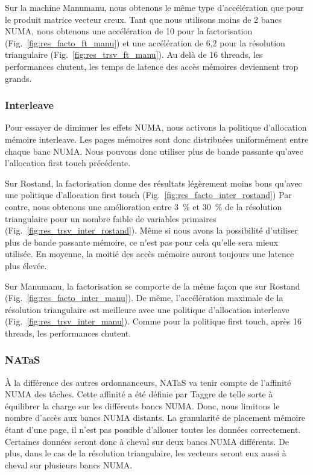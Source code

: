 Sur la machine Manumanu, nous obtenons le même type d'accélération que pour le produit matrice vecteur creux.
%
Tant que nous utilisons moins de 2 bancs NUMA, nous obtenons une accélération de 10 pour la factorisation (Fig.~\ref{fig:res_facto_ft_manu}) et une accélération de 6,2 pour la résolution triangulaire (Fig.~\ref{fig:res_trsv_ft_manu}).
%
Au delà de 16 threads, les performances chutent, les temps de latence des accès mémoires deviennent trop grands.


\subsubsection{Interleave}
Pour essayer de diminuer les effets NUMA, nous activons la politique d'allocation mémoire interleave.
%
Les pages mémoires sont donc distribuées uniformément entre chaque banc NUMA.
%
Nous pouvons donc utiliser plus de bande passante qu'avec l'allocation first touch précédente.


Sur Rostand, la factorisation donne des résultats légèrement moins bons qu'avec une politique d'allocation first touch (Fig.~\ref{fig:res_facto_inter_rostand})
%
Par contre, nous obtenons une amélioration entre 3~\% et 30~\% de la résolution triangulaire pour un nombre faible de variables primaires (Fig.~\ref{fig:res_trsv_inter_rostand}).
%
Même si nous avons la possibilité d'utiliser plus de bande passante mémoire, ce n'est pas pour cela qu'elle sera mieux utilisée.
%
En moyenne, la moitié des accès mémoire auront toujours une latence plus élevée.



Sur Manumanu, la factorisation se comporte de la même façon que sur Rostand (Fig.~\ref{fig:res_facto_inter_manu}).
%
De même, l'accélération maximale de la résolution triangulaire est meilleure avec une politique d'allocation interleave (Fig.~\ref{fig:res_trsv_inter_manu}).
%
Comme pour la politique first touch, après 16 threads, les performances chutent.


\subsubsection{NATaS}
\`A la différence des autres ordonnanceurs, NATaS va tenir compte de l'affinité NUMA des tâches.
%
Cette affinité a été définie par Taggre de telle sorte à équilibrer la charge sur les différents bancs NUMA.
%
Donc, nous limitons le nombre d'accès aux bancs NUMA distants.
%
La granularité de placement mémoire étant d'une page, il n'est pas possible d'allouer toutes les données correctement.
%
Certaines données seront donc à cheval sur deux bancs NUMA différents.
%
De plus, dans le cas de la résolution triangulaire, les vecteurs seront eux aussi à cheval sur plusieurs bancs NUMA.



